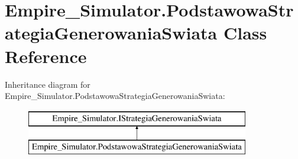 \hypertarget{class_empire___simulator_1_1_podstawowa_strategia_generowania_swiata}{\section{Empire\+\_\+\+Simulator.\+Podstawowa\+Strategia\+Generowania\+Swiata Class Reference}
\label{class_empire___simulator_1_1_podstawowa_strategia_generowania_swiata}
}
Inheritance diagram for Empire\+\_\+\+Simulator.\+Podstawowa\+Strategia\+Generowania\+Swiata\+:\begin{figure}[H]
\begin{center}
\leavevmode
\includegraphics[height=2.000000cm]{class_empire___simulator_1_1_podstawowa_strategia_generowania_swiata}
\end{center}
\end{figure}
